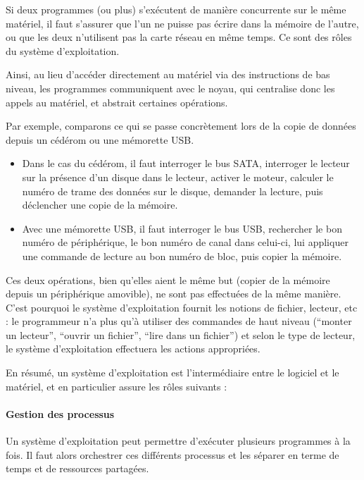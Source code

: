 Si deux programmes (ou plus) s'exécutent de manière concurrente sur le même
matériel, il faut s'assurer que l'un ne puisse pas écrire dans la mémoire de
l'autre, ou que les deux n'utilisent pas la carte réseau en même temps. Ce sont
des rôles du système d'exploitation.

Ainsi, au lieu d'accéder directement au matériel via des instructions de bas
niveau, les programmes communiquent avec le noyau, qui centralise donc les
appels au matériel, et abstrait certaines opérations.

Par exemple, comparons ce qui se passe concrètement lors de la copie de données
depuis un cédérom ou une mémorette USB.

\begin{itemize}

  \item Dans le cas du cédérom, il faut interroger le bus SATA, interroger le
    lecteur sur la présence d'un disque dans le lecteur, activer le moteur,
    calculer le numéro de trame des données sur le disque, demander la lecture,
    puis déclencher une
    copie de la mémoire.

  \item Avec une mémorette USB, il faut interroger le bus USB, rechercher le bon
    numéro de périphérique, le bon numéro de canal dans celui-ci, lui appliquer
    une commande de lecture au bon numéro de bloc, puis copier la mémoire.

\end{itemize}

Ces deux opérations, bien qu'elles aient le même but (copier de la mémoire
depuis un périphérique amovible), ne sont pas effectuées de la même manière.
C'est pourquoi le système d'exploitation fournit les notions de fichier,
lecteur, etc : le programmeur n'a plus qu'à utiliser des commandes de haut
niveau (``monter un lecteur'', ``ouvrir un fichier'', ``lire dans un fichier'')
et selon le type de lecteur, le système d'exploitation effectuera les actions
appropriées.

En résumé, un système d'exploitation est l'intermédiaire entre le logiciel et
le matériel, et en particulier assure les rôles suivants :


\paragraph{Gestion des processus}

Un système d'exploitation peut permettre d'exécuter plusieurs programmes à la
fois. Il faut alors orchestrer ces différents processus et les séparer en terme
de temps et de ressources partagées.

